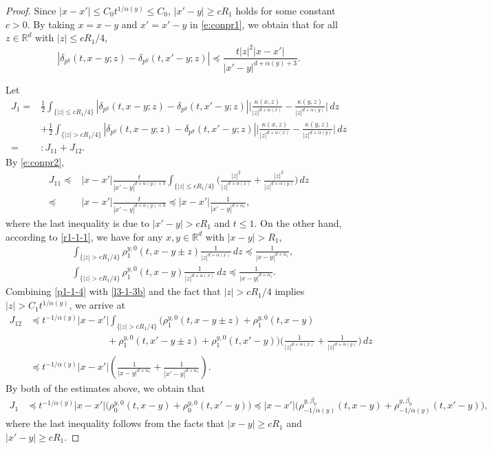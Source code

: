 \documentclass[a4paper,11pt]{amsart}
\renewcommand{\le}{\leqslant}
\renewcommand{\ge}{\geqslant}
\newcommand{\R}{\mathds R}
\newcommand{\B}{\beta}
\newcommand{\p}{\preceq}
\newcommand{\A}{\alpha}
\theoremstyle{definition}
\begin{document}
\begin{proof}
Since $|x-x'|\le C_0t^{{1/\A(y)}}\le C_0$, $|x'-y|\ge cR_1$ holds for some constant $c>0$.
By taking $x=x-y$ and $x'=x'-y$ in \eqref{e:conpr1}, we obtain that for all $z\in\R^d$ with $|z|\le {cR_1}/{4}$,
\begin{equation}\label{e:conpr2} |\delta_{p^y}(t,x-y;z)-\delta_{p^y}(t,x'-y;z) |\p \frac{t|z|^2|x-x'|}{|x'-y|^{d+\A(y)+3}}.  \end{equation}

Let \begin{equation}\label{p3-1-3a}
\begin{split}
J_1=&\frac{1}{2}\int_{\{|z|\le {cR_1}/{4}\}} |\delta_{p^y}(t,x-y;z)-\delta_{p^y}(t,x'-y;z)| \bigg|\frac{\kappa(x,z)}{|z|^{d+\alpha(x)}}-\frac{\kappa(y,z)}{|z|^{d+\alpha(y)}} \bigg|\,dz\\
&+ \frac{1}{2}\int_{\{|z|> {cR_1}/{4}\}} |\delta_{p^y}(t,x-y;z)-\delta_{p^y}(t,x'-y;z)| \bigg|\frac{\kappa(x,z)}{|z|^{d+\alpha(x)}}-\frac{\kappa(y,z)}{|z|^{d+\alpha(y)}} \bigg|\,dz\\
=&:J_{11}+J_{12}.
 \end{split}
\end{equation}
 By \eqref{e:conpr2},
 \begin{align*}J_{11}\p &|x-x'|\frac{t}{|x'-y|^{d+\A(y)+3}} \int_{\{|z|\le {cR_1}/{4}\}}\bigg( \frac{|z|^2}{|z|^{d+\A(x)}}+\frac{|z|^2}{|z|^{d+\A(y)}} \bigg)\,dz\\
 \p& |x-x'|\frac{t}{|x'-y|^{d+\A(y)+3}} \p |x-x'|\frac{1}{|x'-y|^{d+\A_1}},
 \end{align*} where the last inequality is due to $|x'-y|>cR_1$ and $t\le 1$.
On the other hand, according to \eqref{r1-1-1}, we have for any $x,y\in\R^d$ with $|x-y|>R_1$,
\begin{equation}\label{l3-1-3b}
\begin{split}
&\int_{\{|z|>{cR_1}/{4}\}} \rho_1^{y,0}(t,x-y\pm z) \frac{1}{|z|^{d+\A (x)}}\,dz \p \frac{1}{|x-y|^{d+\A_1}},\\
&\int_{\{|z|>{cR_1}/{4}\}} \rho_1^{y,0}(t,x-y) \frac{1}{|z|^{d+\A (x)}}\,dz \p \frac{1}{|x-y|^{d+\A_1}}.
\end{split}
\end{equation}
Combining \eqref{p1-1-4} with \eqref{l3-1-3b} and the fact that $|z|>{cR_1}/{4}$ implies $|z|>C_1t^{{1/\A(y)}}$, we arrive at
\begin{align*}
J_{12}&\p t^{-{1/\A(y)}}|x-x'| \int_{\{|z|>{cR_1}/{4}\}}\Big(\rho_1^{y,0}(t,x-y\pm z)+\rho_1^{y,0}(t,x-y)\\
&\qquad \qquad\qquad\qquad +\rho_1^{y,0}(t,x'-y\pm z)+\rho_1^{y,0}(t,x'-y)\Big)
\bigg(\frac{1}{|z|^{d+\alpha(x)}}+\frac{1}{|z|^{d+\alpha(y)}} \bigg)\,dz\\
&\p t^{-{1/\A(y)}}|x-x'| \left( \frac{1}{|x-y|^{d+\A_1}}+
\frac{1}{|x'-y|^{d+\A_1}} \right). \end{align*} By both of the
estimates above, we obtain that
 \begin{align*}J_1&\p t^{-{1/\A(y)}}|x-x'| \big( \rho_0^{y,0}(t,x-y)+\rho_0^{y,0}(t,x'-y)\big)\p  |x-x'| \big( \rho_{-{1/\A(y)}}^{y,\B_0}(t,x-y)+\rho_{-{1/\A(y)}}^{y,\B_0}(t,x'-y)\big), \end{align*}
where the last inequality follows from the facts that $|x-y|\ge cR_1$ and $|x'-y|\ge c R_1$.



\end{proof}
\end{document}
